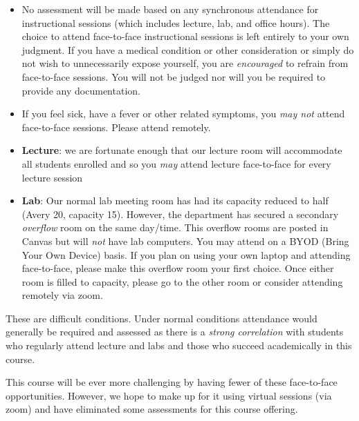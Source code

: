\documentclass[12pt]{scrartcl}
\begin{document}
\begin{itemize}
  \item No assessment will be made based on any synchronous attendance 
  for instructional sessions (which includes lecture, lab, and 
  office hours).  The choice to attend face-to-face
  instructional sessions is left entirely to your own judgment.  If you have
  a medical condition or other consideration or simply do not wish to
  unnecessarily expose yourself, you are \emph{encouraged} to refrain
  from face-to-face sessions.  You will not be judged nor will you be
  required to provide any documentation.
  
  \item If you feel sick, have a fever or other related symptoms, you
  \emph{may not} attend face-to-face sessions.  Please attend remotely.
  
  \item \textbf{Lecture}: we are fortunate enough that our lecture
  room will accommodate all students enrolled and so you 
  \emph{may} attend lecture face-to-face for every lecture session
  
  \item \textbf{Lab}: Our normal lab meeting
  room has had its capacity reduced to half (Avery 20, capacity 15).  
  However, the department has secured a secondary \emph{overflow} room
  on the same day/time.  This overflow rooms are posted in 
  Canvas but will \emph{not} have lab computers.  You may attend
  on a BYOD (Bring Your Own Device) basis.  If you plan on using 
  your own laptop and attending face-to-face, 
  please make this overflow room your first choice.  Once either
  room is filled to capacity, please go to the other room or 
  consider attending remotely via zoom.
  
\end{itemize}

These are difficult conditions.  Under normal conditions attendance
would generally be required and assessed as there is a 
\emph{strong correlation} with students who regularly 
attend lecture and labs and those who succeed academically
in this course. 

This course will be ever more challenging by having fewer of these
face-to-face opportunities.  However, we hope to make up for it using
virtual sessions (via zoom) and have eliminated some assessments
for this course offering.  
\end{document}
